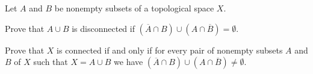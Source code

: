 \item Let $A$ and $B$ be nonempty subsets of a topological space $X$. 
\ba
\item Prove that $A \cup B$ is disconnected if $(\overline{A} \cap B ) \cup (A \cap \overline{B}) = \emptyset$. 
\item Prove that $X$ is connected if and only if for every pair of nonempty subsets $A$ and $B$ of $X$ such that $X = A \cup B$ we have $(\overline{A} \cap B ) \cup (A \cap \overline{B}) \neq \emptyset$.

\ea

\begin{comment}

\ExerciseSolution 
\ba
\item Let $A$ and $B$ be nonempty subsets of a space $X$. Assume that $(\overline{A} \cap B ) \cup (A \cap \overline{B}) = \emptyset$. Then  $\overline{A} \cap B  = \emptyset$ and $A \cap \overline{B} = \emptyset$. Note that 
\[(A \cap B) \subseteq (\overline{A} \cap B) = \emptyset,\]
so $A$ and $B$ must be disjoint. Let $U = X \setminus \overline{A}$ and $V = X \setminus \overline{B}$. We will show that $U$ and $V$ form a separation of $A$ and $B$. Since closures are closed sets, we know that $U$ and $V$ are open sets. We know that $B$ is nonempty, and $\overline{A} \cap B = \emptyset$, so $B \subseteq U$. Similarly, $A \subseteq V$. So $(A \cup B) \subseteq (U \cup V)$. To complete the proof, we see that $A \subseteq \overline{A}$, so $A \cap U = \emptyset$. Similarly, $B \cap V = \emptyset$. So
\[U \cap V \cap (A \cup B) = (U \cap V \cap A) \cup (U \cap V \cap B) = \emptyset.\]
Therefore, $A$ and $B$ are disconnected. 

\item Assume that $X$ is a connected topological space, and let $A$ and $B$ be nonempty subsets of $X$ with $A \cup B = X$. By the first part of the problem, if $(\overline{A} \cap B ) \cup (A \cap \overline{B}) = \emptyset$, then $A \cup B = X$ is disconnected. We conclude that $(\overline{A} \cap B ) \cup (A \cap \overline{B}) \neq \emptyset$.

Finally, assume that for any nonempty subsets $A$ and $B$ of $X$ such that $X = A \cup B$ we have $(\overline{A} \cap B ) \cup (A \cap \overline{B}) \neq \emptyset$. To prove that $X$ is connected, we will show that $X$ contains no non-trivial subset that is both open and closed. We proceed by contradiction and assume that there is a nonempty proper subset $A$ of $X$ that is both open and closed. Then $X \setminus A$ is also open and closed. Since $A$ and $X \setminus A$ are not empty and $X = A \cup (X \setminus A)$, our hypothesis tells us that $(\overline{A} \cap (X \setminus A) ) \cup (A \cap \overline{X \setminus A}) \neq \emptyset$.  But $A$ and $X \setminus A$ are closed, so we have $(A \cap (X \setminus A)) \neq \emptyset$, which cannot happen. We conclude that $X$ contains no non-trivial subset that is both open and closed, or that $X$ is connected. 

\ea

\end{comment}

